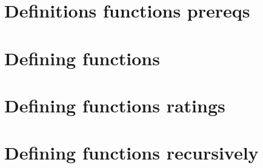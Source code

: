 \section*{Definitions functions prereqs}

\vfill
\section*{Defining functions}

\vfill
\section*{Defining functions ratings}

\vfill
\section*{Defining functions recursively}

\vfill
